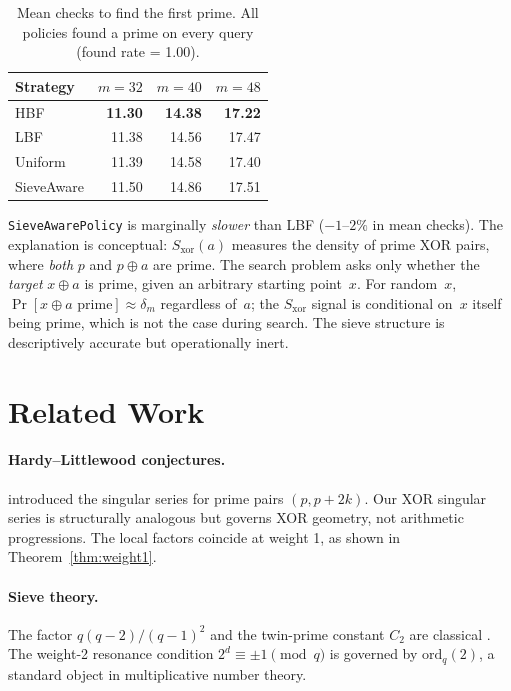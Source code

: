 \documentclass[12pt]{article}
\newcommand{\ord}{\mathrm{ord}}
\begin{document}
\begin{table}[h]
\centering
\caption{Mean checks to find the first prime.  All policies found a prime
on every query (found rate = 1.00).}
\label{tab:sieveaware}
\begin{tabular}{lrrr}
\toprule
Strategy & $m=32$ & $m=40$ & $m=48$ \\
\midrule
HBF         & \textbf{11.30} & \textbf{14.38} & \textbf{17.22} \\
LBF         & 11.38 & 14.56 & 17.47 \\
Uniform     & 11.39 & 14.58 & 17.40 \\
SieveAware  & 11.50 & 14.86 & 17.51 \\
\bottomrule
\end{tabular}
\end{table}

\noindent
\texttt{SieveAwarePolicy} is marginally \emph{slower} than LBF ($-1$--$2\%$ in mean checks).
The explanation is conceptual: $S_{\mathrm{xor}}(a)$ measures the density of
prime XOR pairs, where \emph{both} $p$ and $p \oplus a$ are prime.
The search problem asks only whether the \emph{target} $x \oplus a$ is prime,
given an arbitrary starting point~$x$.
For random~$x$, $\Pr[x \oplus a \text{ prime}] \approx \delta_m$
regardless of~$a$; the $S_{\mathrm{xor}}$ signal is conditional on~$x$
itself being prime, which is not the case during search.
The sieve structure is descriptively accurate but operationally inert.

\section{Related Work}
\label{sec:related}

\paragraph{Hardy--Littlewood conjectures.}
\citet{hardylittlewood1923} introduced the singular series for prime pairs
$(p, p+2k)$.  Our XOR singular series is structurally analogous but
governs XOR geometry, not arithmetic progressions.
The local factors coincide at weight 1, as shown in Theorem~\ref{thm:weight1}.

\paragraph{Sieve theory.}
The factor $q(q-2)/(q-1)^2$ and the twin-prime constant $C_2$ are classical
\citep{granville1995}. The weight-2 resonance condition $2^d \equiv \pm1 \pmod q$
is governed by $\ord_q(2)$, a standard object in multiplicative number theory.
\end{document}
